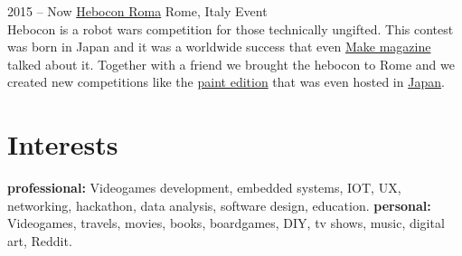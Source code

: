 \documentclass[]{friggeri-cv} %
\begin{document}
\begin{entrylist}
\entry
{2015 -- Now}
{\href{https://www.facebook.com/HeboconRoma/}{Hebocon Roma}}
{Rome, Italy}
{Event\\
	Hebocon is a robot wars competition for those technically ungifted. This contest was born in Japan and it was a worldwide success that even \href{https://makezine.com/2017/05/08/hebocon-crappy-robot-competition/}{Make magazine} talked about it. Together with a friend we brought the hebocon to Rome and we created new competitions like the \href{https://www.youtube.com/watch?v=SF5oQEZsgzA}{paint edition} that  was even hosted in \href{http://portal.nifty.com/kiji/161011197795_1.htm}{Japan}.
}


\end{entrylist}




\section{Interests}

\textbf{professional:} Videogames development, embedded systems, IOT, UX, networking, hackathon, data analysis, software design, education. \textbf{personal:} Videogames, travels, movies, books, boardgames, DIY, tv shows, music, digital art, Reddit.
\end{document}
